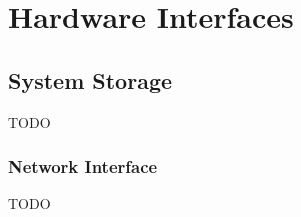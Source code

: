 \section{Hardware Interfaces} \label{sec:hardwareinterfaces}


\subsection{System Storage}
TODO

\subsubsection{Network Interface}
TODO

